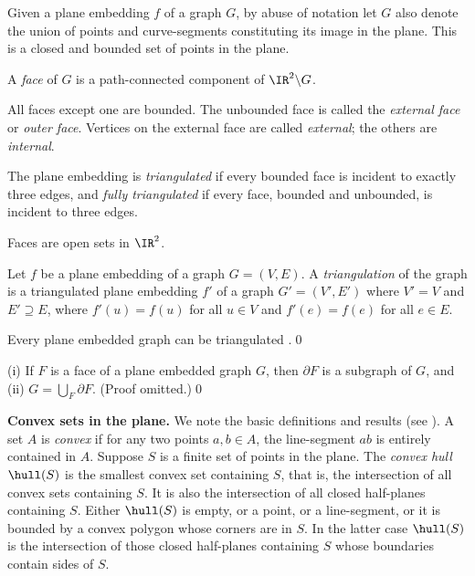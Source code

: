 \begin{definition}
\label{faces of graph} Given a plane embedding $f$ of a graph $G$, by abuse of notation
let $G$ also denote the union of points and curve-segments
constituting its image in the plane.  This is a closed and
bounded set of points in the plane.

A {\em face} of $G$ is a path-connected component
of $\IR^2\backslash G$.

All faces except one are bounded.  The unbounded face
is called the {\em external face} or {\em outer face}.  Vertices on the
external face  are called {\em external}; the others are
{\em internal}.

The plane embedding is {\em triangulated} if every bounded
face is incident to exactly three edges, and {\em fully triangulated}
if every face, bounded and unbounded, is incident to three edges.
\end{definition}

Faces are open sets in $\IR^2$.

\begin{definition}
\label{triangulation} Let $f$ be a plane embedding of a graph
$G = (V,E)$. A {\em triangulation} of the
graph is a triangulated plane embedding $f'$ of
a graph $G' = (V',E')$ where $V' = V$ and
$E' \supseteq E$, where $f'(u) = f(u)$ for all
$u\in V$ and $f'(e) = f(e)$ for all $e \in E$.
\end{definition}

\begin{proposition}
\label{all embeddings triangulable} Every plane embedded graph can be triangulated
{\rm \cite{kant}}.\qed
\end{proposition}

\begin{proposition}
\label{partial F is a subgraph} {\rm (i)} If $F$ is a face of a plane embedded graph $G$,
then $\partial F$ is a subgraph of $G$, and
{\rm (ii)} $G=\bigcup_F \partial F$. (Proof omitted.)\qed
\end{proposition}


\numpara
\label{convexity} {\bf Convex sets in the plane.}
We note the basic definitions and results (see \cite{brondstred}).
A set $A$ is {\em convex} if for any two points $a,b \in A$,
the line-segment $ab$ is entirely contained in $A$.  Suppose $S$ is
a finite set of points in the plane.
The {\em convex hull} $\hull(S)$
is the smallest convex set containing $S$,
that is, the intersection of all convex sets containing $S$.
It is also the intersection of all closed half-planes containing
$S$.  Either $\hull(S)$ is empty, or a point, or a
line-segment, or it is bounded by a convex polygon
whose corners are in $S$.  In the latter case $\hull(S)$ is
the intersection of those closed half-planes containing
$S$ whose boundaries contain sides of $S$.

